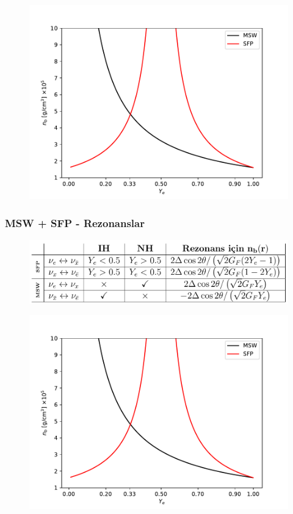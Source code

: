 \documentclass[10pt]{beamer}
\begin{document}
\begin{frame}[noframenumbering]
\begin{minipage}{0.45\textwidth}
\begin{figure}[hbt!]
            \includegraphics[width=1.2\textwidth]{fig/resonance_nb_Ye.pdf}
        \end{figure}
    \end{minipage}
\end{frame}

\begin{frame}
    \frametitle{MSW + SFP - Rezonanslar}
    \begin{figure}[hbt!]
        \centering
        \includegraphics[width=\textwidth]{fig/rezonanslar.png}
    \end{figure}
    \begin{figure}[hbt!]
        \centering
        \includegraphics[width=.6\textwidth]{fig/resonance_nb_Ye.pdf}
    \end{figure}
\end{frame}
\end{document}
